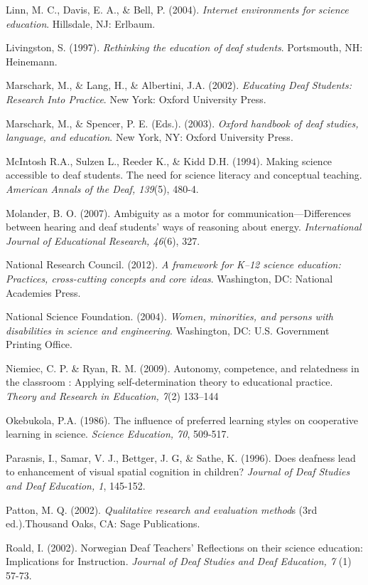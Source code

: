 \documentclass[11.5pt]{sig-alternate} %
\begin{document}
Linn, M. C., Davis, E. A., \& Bell, P. (2004). \textit{Internet environments for science education}. Hillsdale, NJ: Erlbaum.

Livingston, S. (1997). \textit{Rethinking the education of deaf students}. Portsmouth, NH: Heinemann.

Marschark, M., \& Lang, H., \& Albertini, J.A. (2002). \textit{Educating Deaf Students: Research Into Practice}.  New York: Oxford University Press. 

Marschark, M., \& Spencer, P. E. (Eds.). (2003). \textit{Oxford handbook of deaf studies, language, and education}. New York, NY: Oxford University Press.

McIntosh R.A., Sulzen L., Reeder K., \& Kidd D.H. (1994). Making science accessible to deaf students. The need for science literacy and conceptual teaching.  \textit{American Annals of the Deaf, 139}(5), 480-4.

Molander, B. O. (2007). Ambiguity as a motor for communication—Differences between hearing and deaf students’ ways of reasoning about energy. \textit{International Journal of Educational Research, 46}(6), 327. 

National Research Council. (2012). \textit{A framework for K–12 science education: Practices, cross-cutting concepts and core ideas}. Washington, DC: National Academies Press.

National Science Foundation. (2004). \textit{Women, minorities, and persons with disabilities in science and engineering}. Washington, DC: U.S. Government Printing Office.

Niemiec, C. P. \& Ryan, R. M. (2009). Autonomy, competence, and relatedness in the classroom : Applying self-determination theory to educational practice. \textit{Theory and Research in Education, 7}(2) 133–144

Okebukola, P.A. (1986). The influence of preferred learning styles on cooperative learning in science. \textit{Science Education, 70}, 509-517.

Parasnis, I., Samar, V. J., Bettger, J. G, \& Sathe, K. (1996). Does deafness lead to enhancement of visual spatial cognition in children? \textit{Journal of Deaf Studies and Deaf Education, 1}, 145-152.

Patton, M. Q. (2002). \textit{Qualitative research and evaluation method}s (3rd ed.).Thousand Oaks, CA: Sage Publications.

Roald, I. (2002). Norwegian Deaf Teachers’ Reflections on their science education: Implications for Instruction. \textit{Journal of Deaf Studies and Deaf Education, 7} (1) 57-73. 
\end{document}
